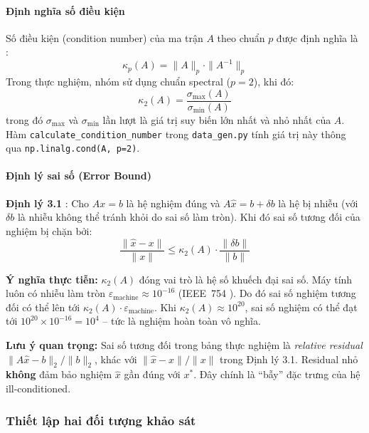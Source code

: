 \paragraph{Định nghĩa số điều kiện}

Số điều kiện (condition number) của ma trận $A$ theo chuẩn $p$ được định nghĩa là \cite{trefethen}:
\begin{equation}
    \kappa_p(A) = \|A\|_p \cdot \|A^{-1}\|_p
\end{equation}
Trong thực nghiệm, nhóm sử dụng chuẩn spectral ($p = 2$), khi đó:
\begin{equation}
    \kappa_2(A) = \frac{\sigma_{\max}(A)}{\sigma_{\min}(A)}
\end{equation}
trong đó $\sigma_{\max}$ và $\sigma_{\min}$ lần lượt là giá trị suy biến lớn nhất và nhỏ nhất của $A$. Hàm \texttt{calculate\_condition\_number} trong \texttt{data\_gen.py} tính giá trị này thông qua \texttt{np.linalg.cond(A, p=2)}.

\paragraph{Định lý sai số (Error Bound)}

\textbf{Định lý 3.1} \cite{trefethen}: Cho $Ax = b$ là hệ nghiệm đúng và $A\hat{x} = b + \delta b$ là hệ bị nhiễu (với $\delta b$ là nhiễu không thể tránh khỏi do sai số làm tròn). Khi đó sai số tương đối của nghiệm bị chặn bởi:
\begin{equation}
    \frac{\|\hat{x} - x\|}{\|x\|} \leq \kappa_2(A) \cdot \frac{\|\delta b\|}{\|b\|}
\end{equation}

\textbf{Ý nghĩa thực tiễn:} $\kappa_2(A)$ đóng vai trò là hệ số khuếch đại sai số. Máy tính luôn có nhiễu làm tròn $\varepsilon_{\text{machine}} \approx 10^{-16}$ (IEEE~754 \cite{ieee754}). Do đó sai số nghiệm tương đối có thể lên tới $\kappa_2(A) \cdot \varepsilon_{\text{machine}}$. Khi $\kappa_2(A) \approx 10^{20}$, sai số nghiệm có thể đạt tới $10^{20} \times 10^{-16} = 10^4$ -- tức là nghiệm hoàn toàn vô nghĩa.

\textbf{Lưu ý quan trọng:} Sai số tương đối trong bảng thực nghiệm là \textit{relative residual} $\|A\hat{x} - b\|_2 / \|b\|_2$, khác với $\|\hat{x} - x\|/\|x\|$ trong Định lý 3.1. Residual nhỏ \textbf{không} đảm bảo nghiệm $\hat{x}$ gần đúng với $x^*$. Đây chính là ``bẫy'' đặc trưng của hệ ill-conditioned.

\subsubsection{Thiết lập hai đối tượng khảo sát}

